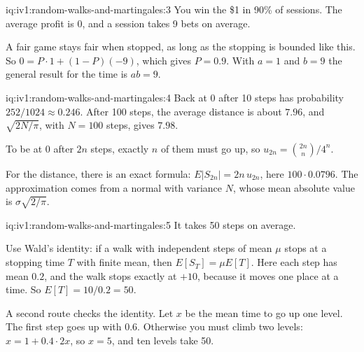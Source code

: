 \enlargethispage{-3\baselineskip}%
\begin{solution}{iq:iv1:random-walks-and-martingales:3}
You win the \$1 in 90\% of sessions. The average profit is 0, and a session takes 9 bets on average.

A fair game stays fair when stopped, as long as the stopping is bounded like this. So $0 = P \cdot 1 + (1 - P)(-9)$, which gives $P = 0.9$. With $a = 1$ and $b = 9$ the general result for the time is $ab = 9$.

\end{solution}

\begin{solution}{iq:iv1:random-walks-and-martingales:4}
Back at 0 after 10 steps has probability $252/1024 \approx 0.246$. After 100 steps, the average distance is about $7.96$, and $\sqrt{2N/\pi}$, with $N = 100$ steps, gives $7.98$.

To be at 0 after $2n$ steps, exactly $n$ of them must go up, so $u_{2n} = \binom{2n}{n}/4^n$.

For the distance, there is an exact formula: $E|S_{2n}| = 2n\,u_{2n}$, here $100 \cdot 0.0796$. The approximation comes from a normal with variance $N$, whose mean absolute value is $\sigma\sqrt{2/\pi}$.

\end{solution}

\enlargethispage{-3\baselineskip}%
\begin{solution}{iq:iv1:random-walks-and-martingales:5}
It takes 50 steps on average.

Use Wald's identity: if a walk with independent steps of mean $\mu$ stops at a stopping time $T$ with finite mean, then $E[S_T] = \mu E[T]$. Here each step has mean $0.2$, and the walk stops exactly at $+10$, because it moves one place at a time. So $E[T] = 10/0.2 = 50$.

A second route checks the identity. Let $x$ be the mean time to go up one level. The first step goes up with $0.6$. Otherwise you must climb two levels: $x = 1 + 0.4 \cdot 2x$, so $x = 5$, and ten levels take 50.

\end{solution}

